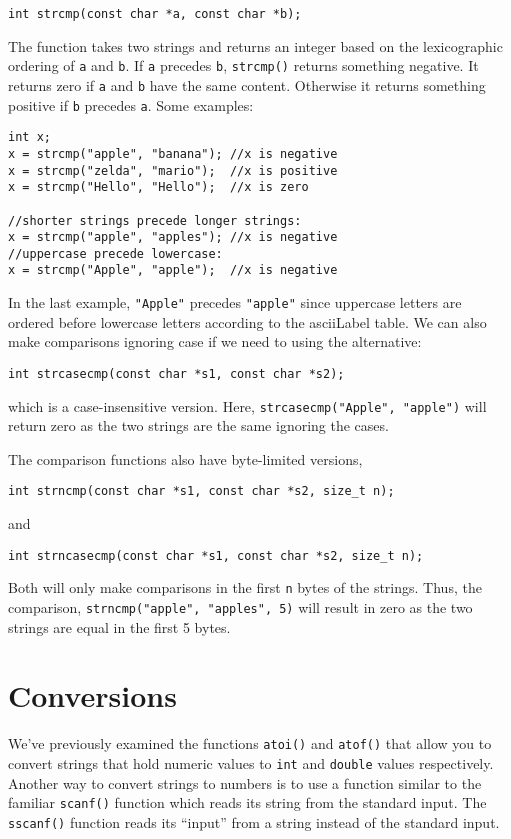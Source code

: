 \texttt{int strcmp(const char *a, const char *b);}

The function takes two strings and returns an integer based
on the lexicographic ordering of \texttt{a} and
\texttt{b}.  If \texttt{a} precedes \texttt{b}, 
\texttt{strcmp()} returns something negative.  It
returns zero if \texttt{a} and \texttt{b} 
have the same content.  Otherwise it returns something
positive if \texttt{b} precedes \texttt{a}.
Some examples:

\begin{verbatim}
int x;
x = strcmp("apple", "banana"); //x is negative
x = strcmp("zelda", "mario");  //x is positive
x = strcmp("Hello", "Hello");  //x is zero

//shorter strings precede longer strings:
x = strcmp("apple", "apples"); //x is negative
//uppercase precede lowercase:
x = strcmp("Apple", "apple");  //x is negative
\end{verbatim}

In the last example, \texttt{"Apple"} precedes
\texttt{"apple"} since uppercase letters are
ordered before lowercase letters according to the
\gls{asciiLabel} table.  We can also make comparisons
ignoring case if we need to using the alternative:

\texttt{int strcasecmp(const char *s1, const char *s2);}

which is a case-insensitive version.  Here, 
\texttt{strcasecmp("Apple", "apple")} will return 
zero as the two strings are the same ignoring the cases.

The comparison functions also have byte-limited versions, 

\texttt{int strncmp(const char *s1, const char *s2, size_t n);}

and

\texttt{int strncasecmp(const char *s1, const char *s2, size_t n);}

Both will only make comparisons in the first \texttt{n}
bytes of the strings.  Thus, the comparison, 
\texttt{strncmp("apple", "apples", 5)} will result in zero as 
the two strings are equal in the first 5 bytes.

\section{Conversions}

We've previously examined the functions \texttt{atoi()} 
and \texttt{atof()} that allow you to convert strings
that hold numeric values to \texttt{int} and 
\texttt{double} values respectively.  Another way to
convert strings to numbers is to use a function similar to
the familiar \texttt{scanf()} function which reads
its string from the standard input.  The \texttt{sscanf()}
function reads its ``input'' from a string instead of the
standard input.

